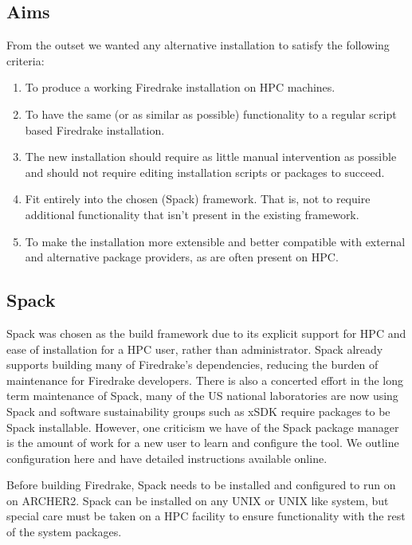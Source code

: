 \documentclass[a4paper,11pt]{article}
\begin{document}
\subsection{Aims}
\label{ssec:spack_aims}
From the outset we wanted any alternative installation to satisfy the following criteria:
\begin{enumerate}[topsep=2pt, partopsep=0pt, itemsep=1pt, parsep=1pt]
	\item To produce a working Firedrake installation on HPC machines.
	\item To have the same (or as similar as possible) functionality to a regular script based Firedrake installation.
	\item The new installation should require as little manual intervention as possible and should not require editing installation scripts or packages to succeed.
	\item Fit entirely into the chosen (Spack) framework. That is, not to require additional functionality that isn't present in the existing framework.
	\item To make the installation more extensible and better compatible with external and alternative package providers, as are often present on HPC.
\end{enumerate}

\subsection{Spack}
\label{ssec:spack}
Spack was chosen as the build framework due to its explicit support for HPC and ease of installation for a HPC user, rather than administrator.
Spack already supports building many of Firedrake's dependencies, reducing the burden of maintenance for Firedrake developers.
There is also a concerted effort in the long term maintenance of Spack, many of the US national laboratories are now using Spack and software sustainability groups such as xSDK\cite{xSDK1,xSDK2} require packages to be Spack installable.
However, one criticism we have of the Spack package manager is the amount of work for a new user to learn and configure the tool.
We outline configuration here and have detailed instructions available online\cite{?}.

Before building Firedrake, Spack needs to be installed and configured to run on on ARCHER2.
Spack can be installed on any UNIX or UNIX like system, but special care must be taken on a HPC facility to ensure functionality with the rest of the system packages.
\end{document}
